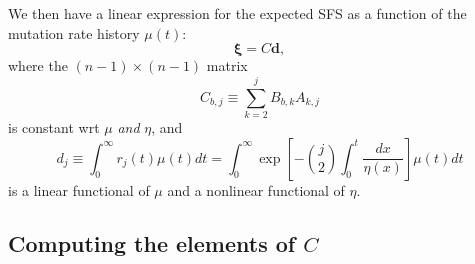 \documentclass[11pt]{article}
\begin{document}
We then have a linear expression for the expected SFS as a function of the mutation rate history $\mu(t)$:
\begin{equation}
\label{eqn:xivec}
\boldsymbol\xi = C \boldsymbol d,
\end{equation}
where the $(n-1)\times(n-1)$ matrix
\[
C_{b,j} \equiv \sum_{k=2}^j B_{b,k} A_{k,j}
\]
is constant wrt $\mu$ \emph{and} $\eta$, and
\begin{equation}
\label{eqn:d}
d_j \equiv \int_0^\infty r_j(t)\mu(t)dt = \int_0^\infty \exp\left[-\binom{j}{2}\int_0^t\frac{dx}{\eta(x)}\right]\mu(t)dt
\end{equation}
is a linear functional of $\mu$ and a nonlinear functional of $\eta$.

\subsection{Computing the elements of $C$}\label{sec:model:C}
\end{document}
